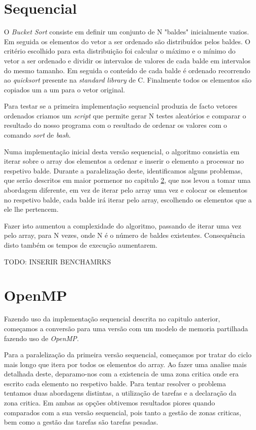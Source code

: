 \documentclass[a4paper]{report}
\begin{document}
\chapter{Sequencial}
O \textit{Bucket Sort} consiste em definir um conjunto de N "baldes"
inicialmente vazios. Em seguida os elementos do vetor a ser ordenado são
distribuídos pelos baldes. O critério escolhido para esta distribuição foi
calcular o máximo e o mínimo do vetor a ser ordenado e dividir os intervalos de
valores de cada balde em intervalos do mesmo tamanho. Em seguida o conteúdo de
cada balde é ordenado recorrendo ao \textit{quicksort} presente na
\textit{standard library} de C. Finalmente todos os elementos são copiados um a
um para o vetor original.

Para testar se a primeira implementação sequencial produzia de facto vetores
ordenados criamos um \textit{script} que permite gerar N testes aleatórios e
comparar o resultado do nosso programa com o resultado de ordenar os valores
com o comando \textit{sort} de \textit{bash}.

Numa implementação inicial desta versão sequencial, o algoritmo consistia em
iterar sobre o array dos elementos a ordenar e inserir o elemento a processar no
respetivo balde. Durante a paralelização deste, identificamos alguns problemas,
que serão descritos em maior pormenor no capitulo \ref{chap:omp}, que nos levou
a tomar uma abordagem diferente, em vez de iterar pelo array uma vez e colocar
os elementos no respetivo balde, cada balde irá iterar pelo array, escolhendo os
elementos que a ele lhe pertencem.

Fazer isto aumentou a complexidade do algoritmo, passando de iterar uma vez pelo
array, para N vezes, onde N é o número de baldes existentes. Consequência disto
também os tempos de execução aumentarem.

TODO: INSERIR BENCHAMRKS

\chapter{OpenMP} \label{chap:omp}
Fazendo uso da implementação sequencial descrita no capitulo anterior, começamos
a conversão para uma versão com um modelo de memoria partilhada fazendo uso de
\textit{OpenMP}.

Para a paralelização da primeira versão sequencial, começamos por tratar do
ciclo mais longo que itera por todos os elementos do array. Ao fazer uma analise
mais detalhada deste, deparamo-nos com a existencia de uma zona critica onde era
escrito cada elemento no respetivo balde. Para tentar resolver o problema
tentamos duas abordagens distintas, a utilização de tarefas e a declaração da
zona critica. Em ambas as opções obtivemos resultados piores quando comparados
com a sua versão sequencial, pois tanto a gestão de zonas criticas, bem como a
gestão das tarefas são tarefas pesadas.
\end{document}
